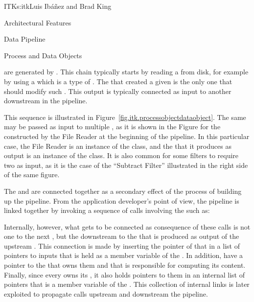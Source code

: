 \begin{aosachapter}{ITK}{s:itk}{Luis Ib\'{a}\~{n}ez and Brad King}
\begin{aosasect1}{Architectural Features}
\begin{aosasect2}{Data Pipeline}
\begin{aosasect3}{Process and Data Objects}

 are generated by . This chain typically starts by
reading a  from disk, for example by using a  which is
a type of . The  that created a given  is
the only one that should modify such . This output  is
typically connected as input to another  downstream in the pipeline.

This sequence is illustrated in Figure~\ref{fig.itk.processobjectdataobject}.
The same  may be passed as input to multiple
, as it is shown in the Figure for the 
constructed by the File Reader at the beginning of the pipeline.
In this particular case, the File Reader is an instance of the
 class, and the  that it produces as
output is an instance of the  class.
It is also common for some filters to require two  as input,
as it is the case of the ``Subtract Filter'' illustrated in the right side of
the same figure.

The  and  are connected together as a
secondary effect of the process of building up the pipeline. From the
application developer's point of view, the pipeline is linked together by
invoking a sequence of calls involving the  such as:

\begin{aosaitemize}
\item {}
\item {}
\item {}
\end{aosaitemize}

Internally, however, what gets to be connected as consequence of these calls is
not one  to the next , but the
downstream  to the  that is produced as
output of the upstream . This connection is made by
inserting the pointer of that  in a list of pointers to inputs
that is held as a member variable of the . In addition,
 have a pointer to the  that owns them
and that is responsible for computing its content. Finally, since every
 owns its , it also holds pointers to
them in an internal list of pointers that is a member variable of the
. This collection of internal links is later exploited to
propagate calls upstream and downstream the pipeline.


\end{aosasect3}
\end{aosasect2}
\end{aosasect1}
\end{aosachapter}
